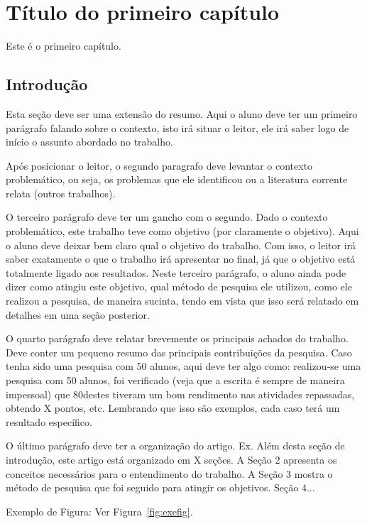 \chapter{T\'itulo do primeiro cap\'itulo} \label{cap:cap1}

Este \'e o primeiro cap\'itulo. 

\section{Introdu\c{c}\~ao}\label{sec:intro}

Esta seção deve ser uma extensão do resumo. Aqui o aluno deve ter um primeiro parágrafo falando sobre o contexto, isto irá situar o leitor, ele irá saber logo de início o assunto abordado no trabalho.

Após posicionar o leitor, o segundo paragrafo deve levantar o contexto problemático, ou seja, os problemas que ele identificou ou a literatura corrente relata (outros trabalhos).

O terceiro parágrafo deve ter um gancho com o segundo. Dado o contexto problemático, este trabalho teve como objetivo (por claramente o objetivo). Aqui o aluno deve deixar bem claro qual o objetivo do trabalho. Com isso, o leitor irá saber exatamente o que o trabalho irá apresentar no final, já que o objetivo está totalmente ligado aos resultados. Neste terceiro parágrafo, o aluno ainda pode dizer como atingiu este objetivo, qual método de pesquisa ele utilizou, como ele realizou a pesquisa, de maneira sucinta, tendo em vista que isso será relatado em detalhes em uma seção posterior.

O quarto parágrafo deve relatar brevemente os principais achados do trabalho. Deve conter um pequeno resumo das principais contribuições da pesquisa. Caso tenha sido uma pesquisa com 50 alunos, aqui deve ter algo como: realizou-se uma pesquisa com 50 alunos, foi verificado (veja que a escrita é sempre de maneira impessoal) que 80\textdiscount  destes tiveram um bom rendimento nas atividades repassadas, obtendo X pontos, etc. Lembrando que isso são exemplos, cada caso terá um resultado específico. 

O último parágrafo deve ter a organização do artigo. Ex. Além desta seção de introdução, este artigo está organizado em X seções. A Seção 2 apresenta os conceitos necessários para o entendimento do trabalho. A Seção 3 mostra o método de pesquisa que foi seguido para atingir os objetivos. Seção 4...

Exemplo de Figura: Ver Figura~\ref{fig:exefig}.

